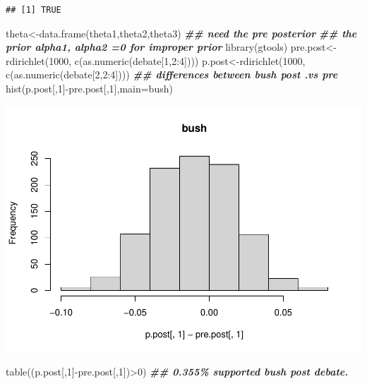 \documentclass[
]{book}
\newenvironment{Shaded}{\begin{snugshade}}{\end{snugshade}}
\newcommand{\AttributeTok}[1]{\textcolor[rgb]{0.77,0.63,0.00}{#1}}
\newcommand{\DecValTok}[1]{\textcolor[rgb]{0.00,0.00,0.81}{#1}}
\newcommand{\DocumentationTok}[1]{\textcolor[rgb]{0.56,0.35,0.01}{\textbf{\textit{#1}}}}
\newcommand{\FunctionTok}[1]{\textcolor[rgb]{0.00,0.00,0.00}{#1}}
\newcommand{\NormalTok}[1]{#1}
\newcommand{\OtherTok}[1]{\textcolor[rgb]{0.56,0.35,0.01}{#1}}
\newcommand{\SpecialCharTok}[1]{\textcolor[rgb]{0.00,0.00,0.00}{#1}}
\newcommand{\StringTok}[1]{\textcolor[rgb]{0.31,0.60,0.02}{#1}}
\theoremstyle{definition}
\theoremstyle{definition}
\theoremstyle{definition}
\theoremstyle{definition}
\theoremstyle{remark}
\begin{document}
\begin{verbatim}
## [1] TRUE
\end{verbatim}

\begin{Shaded}
\begin{Highlighting}[]
\NormalTok{ theta}\OtherTok{\textless{}{-}}\FunctionTok{data.frame}\NormalTok{(theta1,theta2,theta3)}
 \DocumentationTok{\#\# need the pre posterior}
 \DocumentationTok{\#\# the prior alpha1, alpha2 =0 for improper prior}
 \FunctionTok{library}\NormalTok{(gtools)}
\NormalTok{  pre.post}\OtherTok{\textless{}{-}}\FunctionTok{rdirichlet}\NormalTok{(}\DecValTok{1000}\NormalTok{, }\FunctionTok{c}\NormalTok{(}\FunctionTok{as.numeric}\NormalTok{(debate[}\DecValTok{1}\NormalTok{,}\DecValTok{2}\SpecialCharTok{:}\DecValTok{4}\NormalTok{])))}
\NormalTok{   p.post}\OtherTok{\textless{}{-}}\FunctionTok{rdirichlet}\NormalTok{(}\DecValTok{1000}\NormalTok{, }\FunctionTok{c}\NormalTok{(}\FunctionTok{as.numeric}\NormalTok{(debate[}\DecValTok{2}\NormalTok{,}\DecValTok{2}\SpecialCharTok{:}\DecValTok{4}\NormalTok{])))}
  \DocumentationTok{\#\# differences between bush post .vs pre}
   \FunctionTok{hist}\NormalTok{(p.post[,}\DecValTok{1}\NormalTok{]}\SpecialCharTok{{-}}\NormalTok{pre.post[,}\DecValTok{1}\NormalTok{],}\AttributeTok{main=}\StringTok{\textquotesingle{}bush\textquotesingle{}}\NormalTok{)}
\end{Highlighting}
\end{Shaded}

\includegraphics{_main_files/figure-latex/unnamed-chunk-30-1.pdf}

\begin{Shaded}
\begin{Highlighting}[]
   \FunctionTok{table}\NormalTok{((p.post[,}\DecValTok{1}\NormalTok{]}\SpecialCharTok{{-}}\NormalTok{pre.post[,}\DecValTok{1}\NormalTok{])}\SpecialCharTok{\textgreater{}}\DecValTok{0}\NormalTok{) }\DocumentationTok{\#\# 0.355\% supported bush post debate.}
\end{Highlighting}
\end{Shaded}
\end{document}

